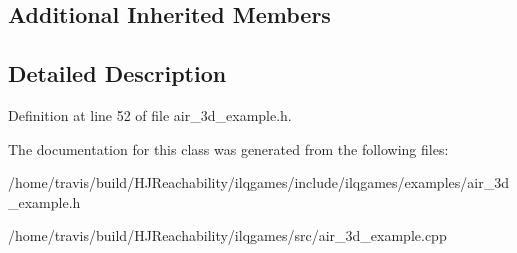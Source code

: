 \subsection*{Additional Inherited Members}


\subsection{Detailed Description}


Definition at line 52 of file air\+\_\+3d\+\_\+example.\+h.



The documentation for this class was generated from the following files\+:\begin{DoxyCompactItemize}
\item 
/home/travis/build/\+H\+J\+Reachability/ilqgames/include/ilqgames/examples/air\+\_\+3d\+\_\+example.\+h\item 
/home/travis/build/\+H\+J\+Reachability/ilqgames/src/air\+\_\+3d\+\_\+example.\+cpp\end{DoxyCompactItemize}
